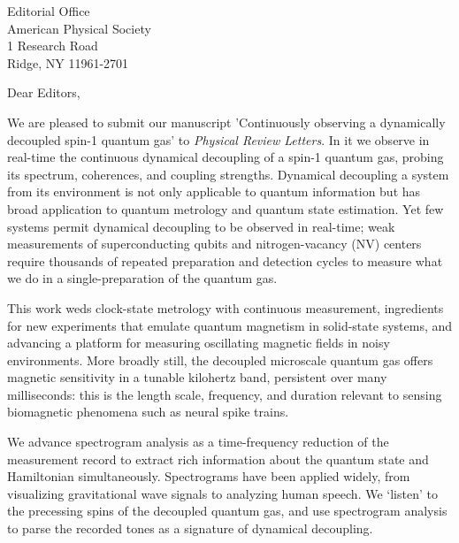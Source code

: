 \documentclass[10pt,letterpaper]{letter} %
\begin{document}
\begin{letter}{
    Editorial Office\\
    American Physical Society\\
    1 Research Road \\
    Ridge, NY 11961-2701\\
}

\opening{Dear Editors,}

We are pleased to submit our manuscript 'Continuously observing a dynamically decoupled spin-1 quantum gas' to \textit{Physical Review Letters}.
In it we observe in real-time the continuous dynamical decoupling of a spin-1 quantum gas, probing its spectrum, coherences, and coupling strengths.
Dynamical decoupling a system from its environment is not only applicable to quantum information but has broad application to quantum metrology and quantum state estimation.
Yet few systems permit dynamical decoupling to be observed in real-time; weak measurements of superconducting qubits and nitrogen-vacancy (NV) centers require thousands of repeated preparation and detection cycles to measure what we do in a single-preparation of the quantum gas.

This work weds clock-state metrology with continuous measurement, ingredients for new experiments that emulate quantum magnetism in solid-state systems, and advancing a platform for measuring oscillating magnetic fields in noisy environments.
More broadly still, the decoupled microscale quantum gas offers magnetic sensitivity in a tunable kilohertz band, persistent over many milliseconds: this is the length scale, frequency, and duration relevant to sensing biomagnetic phenomena such as neural spike trains.

We advance spectrogram analysis as a time-frequency reduction of the measurement record to extract rich information about the quantum state and Hamiltonian simultaneously.
Spectrograms have been applied widely, from visualizing gravitational wave signals to analyzing human speech.
We `listen' to the precessing spins of the decoupled quantum gas, and use spectrogram analysis to parse the recorded tones as a signature of dynamical decoupling.


\end{letter}
\end{document}
